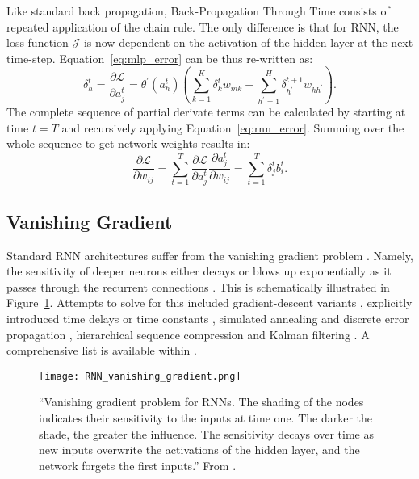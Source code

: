 Like standard back propagation, Back-Propagation Through Time consists of repeated application of the chain rule. The only difference is that for RNN, the loss function $\mathcal{J}$ is now dependent on the activation of the hidden layer at the next time-step. Equation~\ref{eq:mlp_error} can be thus re-written as:
\begin{equation}\label{eq:rnn_error}
	\delta_h^t = \frac{\partial\mathcal{L}}{\partial a_j^t}= \theta^{'}(a_h^t)\left(\sum_{k=1}^{K}\delta_k^{t}w_{mk} + \sum_{h^{'}=1}^{H}\delta_{h^{'}}^{t+1}w_{hh^{'}} \right).
\end{equation}
The complete sequence of partial derivate terms can be calculated by starting at time $t=T$ and recursively applying Equation~\ref{eq:rnn_error}. Summing over the whole sequence to get network weights results in:
\begin{equation}
	\frac{\partial\mathcal{L}}{\partial w_{ij}} = \sum_{t=1}^{T}\frac{\partial\mathcal{L}}{\partial a_j^t}\frac{\partial a_j^t}{\partial w_{ij}} = \sum_{t=1}^{T}\delta_j^tb_i^t.
\end{equation}
\subsection{Vanishing Gradient}
Standard RNN architectures suffer from the vanishing gradient problem \citep{Hochreiter1991}. Namely, the sensitivity of deeper neurons either decays or blows up exponentially as it passes through the recurrent connections \citet{Graves2012}. This is schematically illustrated in Figure~\ref{fig:RNN_vanishing_gradient}. Attempts to solve for this included gradient-descent variants \citep{Pearlmutter1989, Williams1989, Elman1990, Fahlman1991, Schmidhuber1992a}, explicitly introduced time delays or time constants \citep{Lang1990,Plate1993,Lin1996,Mozer1992}, simulated annealing and discrete error propagation \citep{Bengio1994}, hierarchical sequence compression \citep{Schmidhuber1992} and Kalman filtering \citep{Puskorius1994}. A comprehensive list is available within \cite{Hochreiter1997}.

\begin{figure}[ht!]
	\centering
	\texttt{[image: RNN\_vanishing\_gradient.png]}
	\caption[Vanishing gradient problem for RNNs.]{``Vanishing gradient problem for RNNs. The shading of the nodes indicates their sensitivity to the inputs at time one. The darker the shade, the greater the influence. The sensitivity decays over time as new inputs overwrite the activations of the hidden layer, and the network forgets the first inputs.'' From \cite{Graves2012}.}
	\label{fig:RNN_vanishing_gradient}
\end{figure}

